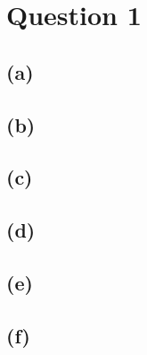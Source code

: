 \section{Question 1}
\subsection{(a)}
\subsection{(b)}
\subsection{(c)}
\subsection{(d)}
\subsection{(e)}
\subsection{(f)}